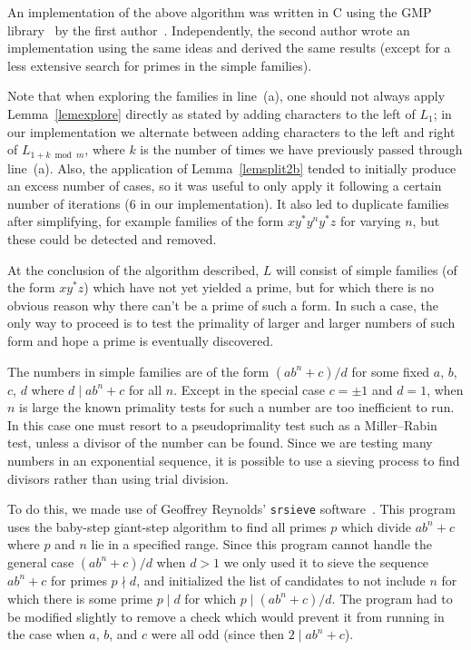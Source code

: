 \documentclass[12pt]{article}
\theoremstyle{plain}
\theoremstyle{definition}
\newcommand{\0}{\mathtt{0}}
\newcommand{\1}{\mathtt{1}}
\newcommand{\2}{\mathtt{2}}
\newcommand{\3}{\mathtt{3}}
\newcommand{\4}{\mathtt{4}}
\newcommand{\5}{\mathtt{5}}
\newcommand{\6}{\mathtt{6}}
\newcommand{\7}{\mathtt{7}}
\newcommand{\8}{\mathtt{8}}
\newcommand{\9}{\mathtt{9}}
\begin{document}
An implementation of the above algorithm was written in C using the GMP library~\cite{gmp} by the first author~\cite{code}.
Independently, the second author wrote an implementation using the same ideas and derived the same results (except for
a less extensive search for primes in the simple families).

Note that when exploring the families in line~(a), one should not always apply Lemma~\ref{lemexplore} directly as stated by adding
characters to the left of $L_1$; in our implementation we alternate between adding characters
to the left and right of $L_{1+k\bmod m}$, where $k$ is the number of times we have previously passed through line~(a).
Also, the application of Lemma~\ref{lemsplit2b} tended to initially
produce an excess number of cases, so it was useful to only apply it following a certain number of iterations (6 in our implementation).
It also led to duplicate families after simplifying, for example families of the form $xy^*y^ny^*z$ for varying $n$,
but these could be detected and removed.

At the conclusion of the algorithm described, $L$ will consist of simple families (of the form $xy^*z$) which have not yet
yielded a prime, but for which there is no obvious reason why there can't be a prime of such a form.
In such a case, the only way to proceed is to test the primality of larger and larger numbers of such form and hope
a prime is eventually discovered.

The numbers in simple families are of the form $(ab^n+c)/d$ for some fixed $a$, $b$, $c$, $d$ where $d\mid ab^n+c$ for all $n$.
Except in the special case $c=\pm1$ and $d=1$, when $n$ is large the known primality tests for such a number are too inefficient to run.
In this case one must resort to a pseudoprimality test such as a Miller--Rabin test, unless a divisor of the number can be found.
Since we are testing many numbers in an exponential sequence, it is possible to use a sieving process to find divisors
rather than using trial division.

To do this, we made use of Geoffrey Reynolds' 
{\tt srsieve} software~\cite{srsieve}.
This program uses the baby-step giant-step
algorithm to find all primes $p$ which divide $ab^n+c$ where $p$ and $n$ lie in a specified range.  Since this program cannot
handle the general case $(ab^n+c)/d$ when $d>1$ we only used it to sieve the sequence $ab^n+c$ for primes $p\nmid d$, and initialized the list of candidates to not include $n$ for which there is some prime $p\mid d$ for which $p\mid(ab^n+c)/d$.
The program had to be modified slightly to remove a check which would prevent it from running in the case when $a$, $b$, and $c$ were all odd (since then $2\mid ab^n+c$).
\end{document}
